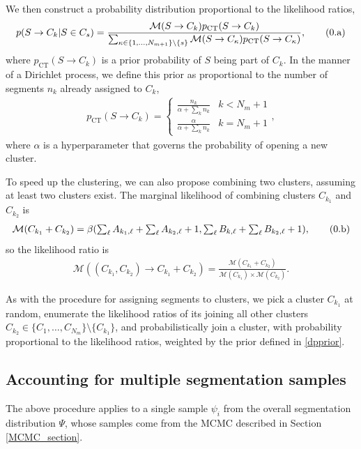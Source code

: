 \documentclass[10pt,letter]{article}
\numberwithin{equation}{section}
\newcommand{\btag}[1]{\addtocounter{equation}{1}\label{#1}\tag{\arabic{section}.\alph{equation}}}
\begin{document}
We then construct a probability distribution proportional to the likelihood ratios,
\begin{align*}
p(S\to C_k|S\in C_s) = \frac{\mathcal{M}(S\to C_{k})p_\text{CT}(S\to C_k)}{\sum_{\kappa\in\{1,\dots,N_{m+1}\}\setminus\{s\}}\mathcal{M}(S\to C_{\kappa})p_\text{CT}(S\to C_\kappa)},\btag{dp_gibbs}
\end{align*}
where $p_\text{CT}(S\to C_k)$ is a prior probability of $S$ being part of $C_k$. In the manner of a Dirichlet process, we define this prior as proportional to the number of segments $n_k$ already assigned to $C_k$,
\begin{align*}
p_\text{CT}(S\to C_k) = \begin{cases}
\frac{n_k}{\alpha + \sum_k n_k} & k < N_m + 1\\
\frac{\alpha}{\alpha + \sum_k n_k} & k = N_m + 1
\end{cases},
\end{align*}
where $\alpha$ is a hyperparameter that governs the probability of opening a new cluster.

To speed up the clustering, we can also propose combining two clusters, assuming at least two clusters exist. The marginal likelihood of combining clusters $C_{k_1}$ and $C_{k_2}$ is
\begin{align*}
\mathcal{M}(C_{k_1}+C_{k_2})=\beta(\textstyle\sum_{\ell}A_{k_1,\ell} + \textstyle\sum_{\ell}A_{k_2,\ell} + 1,\textstyle\sum_{\ell}B_{k,\ell} + \textstyle\sum_{\ell}B_{k_2,\ell} + 1),\btag{dpprior}
\end{align*}
so the likelihood ratio is
\begin{align*}
\mathcal{M}((C_{k_1},C_{k_2})\to C_{k_1}+C_{k_2}) = \frac{\mathcal{M}(C_{k_1}+C_{k_2})}{\mathcal{M}(C_{k_1})\times \mathcal{M}(C_{k_2})}.
\end{align*}

As with the procedure for assigning segments to clusters, we pick a cluster $C_{k_1}$ at random, enumerate the likelihood ratios of its joining all other clusters $C_{k_2}\in\{C_1,\dots,C_{N_m}\}\setminus\{C_{k_1}\}$, and probabilistically join a cluster, with probability proportional to the likelihood ratios, weighted by the prior defined in \eqref{dpprior}.

\subsection{Accounting for multiple segmentation samples}

The above procedure applies to a single sample $\psi_i$ from the overall segmentation distribution $\Psi$, whose samples come from the MCMC described in Section \ref{MCMC_section}.
\end{document}
